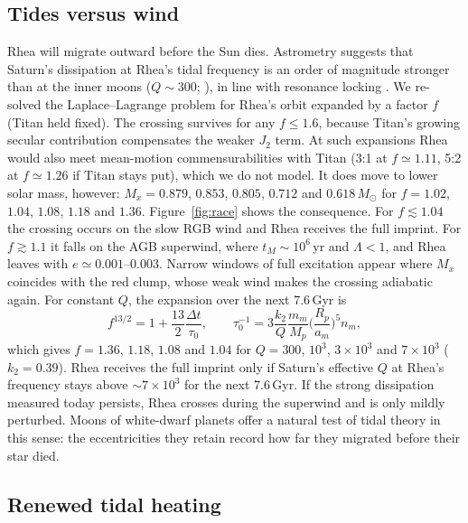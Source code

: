 \documentclass[11pt,a4paper]{article}
\newcommand{\msun}{M_\odot}
\begin{document}
\subsection{Tides versus wind}

Rhea will migrate outward before the Sun dies. Astrometry suggests that Saturn's dissipation at Rhea's tidal frequency is an order of magnitude stronger than at the inner moons ($Q\sim300$; \citealt{Lainey2017}), in line with resonance locking \citep{Fuller2016,Lainey2020}. We re-solved the Laplace--Lagrange problem for Rhea's orbit expanded by a factor $f$ (Titan held fixed). The crossing survives for any $f\le1.6$, because Titan's growing secular contribution compensates the weaker $J_2$ term. At such expansions Rhea would also meet mean-motion commensurabilities with Titan (3:1 at $f\simeq1.11$, 5:2 at $f\simeq1.26$ if Titan stays put), which we do not model. It does move to lower solar mass, however: $M_x=0.879$, $0.853$, $0.805$, $0.712$ and $0.618\,\msun$ for $f=1.02$, $1.04$, $1.08$, $1.18$ and $1.36$. Figure~\ref{fig:race} shows the consequence. For $f\lesssim1.04$ the crossing occurs on the slow RGB wind and Rhea receives the full imprint. For $f\gtrsim1.1$ it falls on the AGB superwind, where $t_M\sim10^6$\,yr and $\Lambda<1$, and Rhea leaves with $e\simeq0.001$--$0.003$. Narrow windows of full excitation appear where $M_x$ coincides with the red clump, whose weak wind makes the crossing adiabatic again. For constant $Q$, the expansion over the next $7.6$\,Gyr is
\begin{equation}
f^{13/2}=1+\frac{13}{2}\frac{\Delta t}{\tau_0},\qquad \tau_0^{-1}=3\frac{k_2}{Q}\frac{m_m}{M_p}\Big(\frac{R_p}{a_m}\Big)^5n_m,
\label{eq:migration}
\end{equation}
which gives $f=1.36$, $1.18$, $1.08$ and $1.04$ for $Q=300$, $10^3$, $3\times10^3$ and $7\times10^3$ ($k_2=0.39$). Rhea receives the full imprint only if Saturn's effective $Q$ at Rhea's frequency stays above $\sim7\times10^3$ for the next 7.6\,Gyr. If the strong dissipation measured today persists, Rhea crosses during the superwind and is only mildly perturbed. Moons of white-dwarf planets offer a natural test of tidal theory in this sense: the eccentricities they retain record how far they migrated before their star died.

\subsection{Renewed tidal heating}
\end{document}
